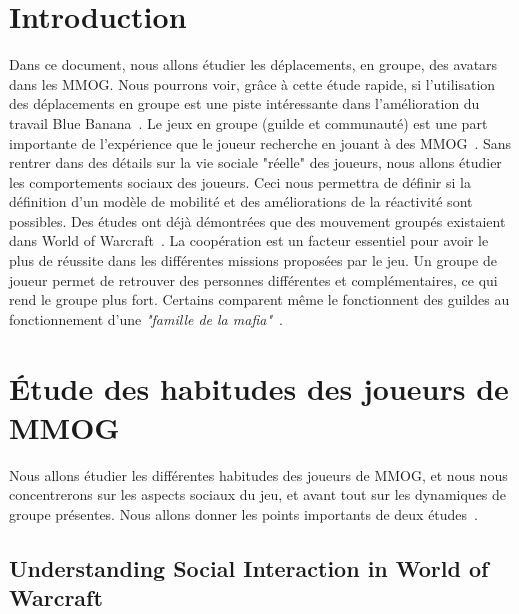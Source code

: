 \documentclass[10pt,twocolumn]{article}
\begin{document}

\newpage
\onecolumn
\tableofcontents
\newpage
\twocolumn



\section{Introduction}
Dans ce document, nous allons étudier les déplacements, en groupe, des avatars dans les MMOG. Nous pourrons voir, grâce à cette étude rapide, si l'utilisation des déplacements en groupe est une piste intéressante dans l'amélioration du travail Blue Banana~\cite{191}. Le jeux en groupe (guilde et communauté) est une part importante de l'expérience que le joueur recherche en jouant à des MMOG~\cite{1501834,1255052}. Sans rentrer dans des détails sur la vie sociale "réelle" des joueurs, nous allons étudier les comportements sociaux des joueurs. Ceci nous permettra de définir si la définition d'un modèle de mobilité et des améliorations de la réactivité sont possibles. Des études ont déjà démontrées que des mouvement groupés existaient dans World of Warcraft~\cite{15141312}. La coopération est un facteur essentiel pour avoir le plus de réussite  dans les différentes missions proposées par le jeu. Un groupe de joueur permet de retrouver des personnes différentes et complémentaires, ce qui rend le groupe plus fort. Certains comparent même le fonctionnent des guildes au fonctionnement d'une \textit{"famille de la mafia"}~\cite{Jakobsson03thesopranos}.


\section{Étude des habitudes des joueurs de MMOG}
Nous allons étudier les différentes habitudes des joueurs de MMOG, et nous nous concentrerons sur les aspects sociaux du jeu, et avant tout sur les dynamiques de groupe présentes. Nous allons donner les points importants de deux études~\cite{1255052,StudyEQ}.

\subsection{Understanding Social Interaction in World of Warcraft}
\end{document}
